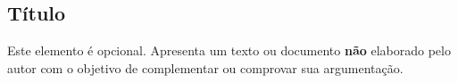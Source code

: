 \documentclass[
        oneside,      %
        english,			
        brazil			 
        ]{abntbibufjf}
\begin{document}

\begin{anexos}

\chapter{\anexoseq T\'itulo} 

Este elemento \'e opcional. Apresenta um texto ou documento \textbf{n\~ao} elaborado pelo autor com o objetivo de complementar ou comprovar sua 
argumenta\c{c}\~ao. 

  
\end{anexos}


\end{document}
